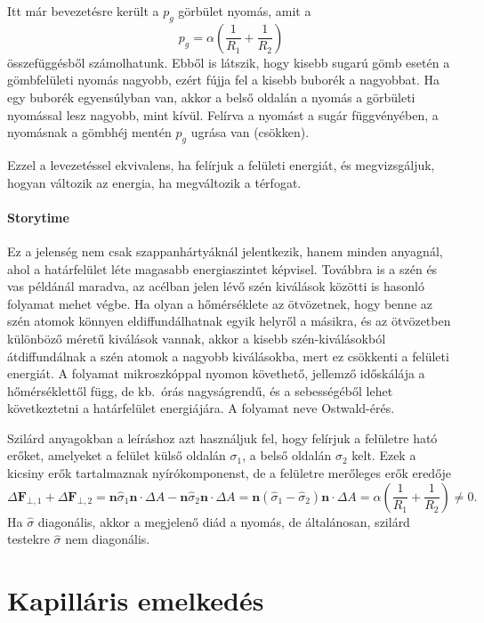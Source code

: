 \documentclass[12pt,a4paper]{scrartcl}
\let\mathbf\bm
\begin{document}
Itt már bevezetésre került a $p_g$ görbület nyomás, amit a 
\[{p_g} = \alpha \left( {\frac{1}{{{R_1}}} + \frac{1}{{{R_2}}}} \right)\]
összefüggésből számolhatunk. Ebből is látszik, hogy kisebb sugarú gömb esetén a gömbfelületi nyomás nagyobb, ezért fújja fel a kisebb buborék a nagyobbat. Ha egy buborék egyensúlyban van, akkor a belső oldalán a nyomás a görbületi nyomással lesz nagyobb, mint kívül. Felírva a nyomást a sugár függvényében, a nyomásnak a gömbhéj mentén $p_g$ ugrása van (csökken).

Ezzel a levezetéssel ekvivalens, ha felírjuk a felületi energiát, és megvizsgáljuk, hogyan változik az energia, ha megváltozik a térfogat.
\footnotesize
\paragraph{Storytime}
Ez a jelenség nem csak szappanhártyáknál jelentkezik, hanem minden anyagnál, ahol a határfelület léte magasabb energiaszintet képvisel. Továbbra is a szén és vas példánál maradva, az acélban jelen lévő szén kiválások közötti is hasonló folyamat mehet végbe. Ha olyan a hőmérséklete az ötvözetnek, hogy benne az szén atomok könnyen eldiffundálhatnak egyik helyről a másikra, és az ötvözetben különböző méretű kiválások vannak, akkor a kisebb szén-kiválásokból átdiffundálnak a szén atomok a nagyobb kiválásokba, mert ez csökkenti a felületi energiát. A folyamat mikroszkóppal nyomon követhető, jellemző időskálája a hőmérséklettől függ, de kb.\ órás nagyságrendű, és a sebességéből lehet következtetni a határfelület energiájára. A folyamat neve Ostwald-érés.

Szilárd anyagokban a leíráshoz azt használjuk fel, hogy felírjuk a felületre ható erőket, amelyeket a felület külső oldalán $\sigma_1$, a belső oldalán $\sigma_2$ kelt. Ezek a kicsiny erők tartalmaznak nyírókomponenst, de a felületre merőleges erők eredője
\[\Delta {{\mathbf{F}}_{ \bot ,1}} + \Delta {{\mathbf{F}}_{ \bot ,2}} = {\mathbf{n}}{\hat \sigma _1}{\mathbf{n}} \cdot \Delta A - {\mathbf{n}}{\hat \sigma _2}{\mathbf{n}} \cdot \Delta A = {\mathbf{n}}\left( {{{\hat \sigma }_1} - {{\hat \sigma }_2}} \right){\mathbf{n}} \cdot \Delta A = \alpha \left( {\frac{1}{{{R_1}}} + \frac{1}{{{R_2}}}} \right) \ne 0.\]
Ha $\hat \sigma$ diagonális, akkor a megjelenő diád a nyomás, de általánosan, szilárd testekre $\hat \sigma$ nem diagonális.
\normalsize

\section{Kapilláris emelkedés}
\end{document}
